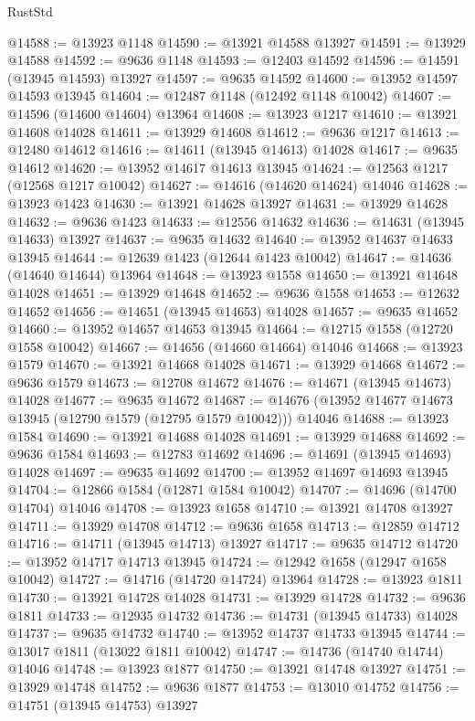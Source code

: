 \begin{lexlean}{RustStd}
\begin{coremodule}
@14588 := @13923 @1148
@14590 := @13921 @14588 @13927
@14591 := @13929 @14588
@14592 := @9636 @1148
@14593 := @12403 @14592
@14596 := @14591 (@13945 @14593) @13927
@14597 := @9635 @14592
@14600 := @13952 @14597 @14593 @13945
@14604 := @12487 @1148 (@12492 @1148 @10042)
@14607 := @14596 (@14600 @14604) @13964
@14608 := @13923 @1217
@14610 := @13921 @14608 @14028
@14611 := @13929 @14608
@14612 := @9636 @1217
@14613 := @12480 @14612
@14616 := @14611 (@13945 @14613) @14028
@14617 := @9635 @14612
@14620 := @13952 @14617 @14613 @13945
@14624 := @12563 @1217 (@12568 @1217 @10042)
@14627 := @14616 (@14620 @14624) @14046
@14628 := @13923 @1423
@14630 := @13921 @14628 @13927
@14631 := @13929 @14628
@14632 := @9636 @1423
@14633 := @12556 @14632
@14636 := @14631 (@13945 @14633) @13927
@14637 := @9635 @14632
@14640 := @13952 @14637 @14633 @13945
@14644 := @12639 @1423 (@12644 @1423 @10042)
@14647 := @14636 (@14640 @14644) @13964
@14648 := @13923 @1558
@14650 := @13921 @14648 @14028
@14651 := @13929 @14648
@14652 := @9636 @1558
@14653 := @12632 @14652
@14656 := @14651 (@13945 @14653) @14028
@14657 := @9635 @14652
@14660 := @13952 @14657 @14653 @13945
@14664 := @12715 @1558 (@12720 @1558 @10042)
@14667 := @14656 (@14660 @14664) @14046
@14668 := @13923 @1579
@14670 := @13921 @14668 @14028
@14671 := @13929 @14668
@14672 := @9636 @1579
@14673 := @12708 @14672
@14676 := @14671 (@13945 @14673) @14028
@14677 := @9635 @14672
@14687 := @14676 (@13952 @14677 @14673 @13945 (@12790 @1579 (@12795 @1579 @10042))) @14046
@14688 := @13923 @1584
@14690 := @13921 @14688 @14028
@14691 := @13929 @14688
@14692 := @9636 @1584
@14693 := @12783 @14692
@14696 := @14691 (@13945 @14693) @14028
@14697 := @9635 @14692
@14700 := @13952 @14697 @14693 @13945
@14704 := @12866 @1584 (@12871 @1584 @10042)
@14707 := @14696 (@14700 @14704) @14046
@14708 := @13923 @1658
@14710 := @13921 @14708 @13927
@14711 := @13929 @14708
@14712 := @9636 @1658
@14713 := @12859 @14712
@14716 := @14711 (@13945 @14713) @13927
@14717 := @9635 @14712
@14720 := @13952 @14717 @14713 @13945
@14724 := @12942 @1658 (@12947 @1658 @10042)
@14727 := @14716 (@14720 @14724) @13964
@14728 := @13923 @1811
@14730 := @13921 @14728 @14028
@14731 := @13929 @14728
@14732 := @9636 @1811
@14733 := @12935 @14732
@14736 := @14731 (@13945 @14733) @14028
@14737 := @9635 @14732
@14740 := @13952 @14737 @14733 @13945
@14744 := @13017 @1811 (@13022 @1811 @10042)
@14747 := @14736 (@14740 @14744) @14046
@14748 := @13923 @1877
@14750 := @13921 @14748 @13927
@14751 := @13929 @14748
@14752 := @9636 @1877
@14753 := @13010 @14752
@14756 := @14751 (@13945 @14753) @13927

\end{coremodule}
\end{lexlean}
